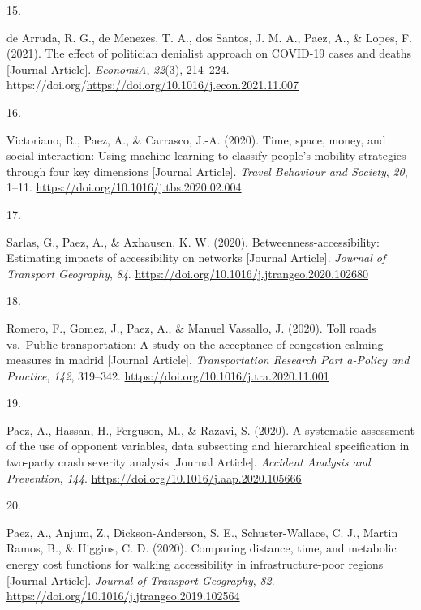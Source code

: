 \documentclass[11pt,a4paper,]{awesome-cv}
\newlength{\csllabelwidth}
\newcommand{\CSLLeftMargin}[1]{\parbox[t]{\csllabelwidth}{#1}}
\newcommand{\CSLRightInline}[1]{\parbox[t]{\linewidth - \csllabelwidth}{#1}}
\begin{document}
\leavevmode{}%
\CSLLeftMargin{15. }
\CSLRightInline{de Arruda, R. G., de Menezes, T. A., dos Santos, J. M.
A., Paez, A., \& Lopes, F. (2021). The effect of politician denialist
approach on COVID-19 cases and deaths {[}Journal Article{]}.
\emph{EconomiA}, \emph{22}(3), 214--224.
https://doi.org/\url{https://doi.org/10.1016/j.econ.2021.11.007}}

\leavevmode{}%
\CSLLeftMargin{16. }
\CSLRightInline{Victoriano, R., Paez, A., \& Carrasco, J.-A. (2020).
Time, space, money, and social interaction: Using machine learning to
classify people's mobility strategies through four key dimensions
{[}Journal Article{]}. \emph{Travel Behaviour and Society}, \emph{20},
1--11. \url{https://doi.org/10.1016/j.tbs.2020.02.004}}

\leavevmode{}%
\CSLLeftMargin{17. }
\CSLRightInline{Sarlas, G., Paez, A., \& Axhausen, K. W. (2020).
Betweenness-accessibility: Estimating impacts of accessibility on
networks {[}Journal Article{]}. \emph{Journal of Transport Geography},
\emph{84}. \url{https://doi.org/10.1016/j.jtrangeo.2020.102680}}

\leavevmode{}%
\CSLLeftMargin{18. }
\CSLRightInline{Romero, F., Gomez, J., Paez, A., \& Manuel Vassallo, J.
(2020). Toll roads vs.~Public transportation: A study on the acceptance
of congestion-calming measures in madrid {[}Journal Article{]}.
\emph{Transportation Research Part a-Policy and Practice}, \emph{142},
319--342. \url{https://doi.org/10.1016/j.tra.2020.11.001}}

\leavevmode{}%
\CSLLeftMargin{19. }
\CSLRightInline{Paez, A., Hassan, H., Ferguson, M., \& Razavi, S.
(2020). A systematic assessment of the use of opponent variables, data
subsetting and hierarchical specification in two-party crash severity
analysis {[}Journal Article{]}. \emph{Accident Analysis and Prevention},
\emph{144}. \url{https://doi.org/10.1016/j.aap.2020.105666}}

\leavevmode{}%
\CSLLeftMargin{20. }
\CSLRightInline{Paez, A., Anjum, Z., Dickson-Anderson, S. E.,
Schuster-Wallace, C. J., Martin Ramos, B., \& Higgins, C. D. (2020).
Comparing distance, time, and metabolic energy cost functions for
walking accessibility in infrastructure-poor regions {[}Journal
Article{]}. \emph{Journal of Transport Geography}, \emph{82}.
\url{https://doi.org/10.1016/j.jtrangeo.2019.102564}}
\end{document}
